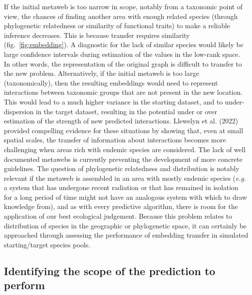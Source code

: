 \documentclass[11pt]{article}
\begin{document}
If the initial metaweb is too narrow in scope, notably from a taxonomic
point of view, the chances of finding another area with enough related
species (through phylogenetic relatedness or similarity of functional
traits) to make a reliable inference decreases. This is because transfer
requires similarity (fig.~\ref{fig:embedding}). A diagnostic for the
lack of similar species would likely be large confidence intervals
during estimation of the values in the low-rank space. In other words,
the representation of the original graph is difficult to transfer to the
new problem. Alternatively, if the initial metaweb is too large
(taxonomically), then the resulting embeddings would need to represent
interactions between taxonomic groups that are not present in the new
location. This would lead to a much higher variance in the starting
dataset, and to under-dispersion in the target dataset, resulting in the
potential under or over estimation of the strength of new predicted
interactions. Llewelyn et al. (2022) provided compelling evidence for
these situations by showing that, even at small spatial scales, the
transfer of information about interactions becomes more challenging when
areas rich with endemic species are considered. The lack of well
documented metawebs is currently preventing the development of more
concrete guidelines. The question of phylogenetic relatedness and
distribution is notably relevant if the metaweb is assembled in an area
with mostly endemic species (\emph{e.g.} a system that has undergone
recent radiation or that has remained in isolation for a long period of
time might not have an analogous system with which to draw knowledge
from), and as with every predictive algorithm, there is room for the
application of our best ecological judgement. Because this problem
relates to distribution of species in the geographic or phylogenetic
space, it can certainly be approached through assessing the performance
of embedding transfer in simulated starting/target species pools.

\hypertarget{identifying-the-scope-of-the-prediction-to-perform}{%
\subsection{Identifying the scope of the prediction to
perform}\label{identifying-the-scope-of-the-prediction-to-perform}}
\end{document}
